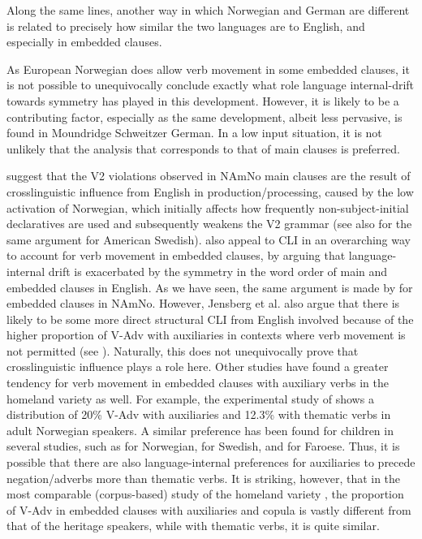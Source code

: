\documentclass[output=paper]{langscibook}
\begin{document}
Along the same lines, another way in which Norwegian and German are different is related to precisely how similar the two languages are to English, and especially in embedded clauses.

As European Norwegian does allow verb movement in some embedded clauses, it is not possible to unequivocally conclude exactly what role language internal-drift towards symmetry has played in this development. However, it is likely to be a contributing factor, especially as the same development, albeit less pervasive, is found in Moundridge Schweitzer German. In a low input situation, it is not unlikely that the analysis that corresponds to that of main clauses is preferred.

\citet{WestergaardEtAl2021} suggest that the V2 violations observed in NAmNo main clauses are the result of crosslinguistic influence from English in production\slash processing, caused by the low activation of Norwegian, which initially affects how frequently non\hyp subject\hyp initial declaratives are used and subsequently weakens the V2 grammar (see also \citealt{LarssonKinn2022} for the same argument for American Swedish). \citet{HoppPutnam2015} also appeal to CLI in an overarching way to account for verb movement in embedded clauses, by arguing that language-internal drift is exacerbated by the symmetry in the word order of main and embedded clauses in English. As we have seen, the same argument is made by \citet{JensbergEtAl2024} for embedded clauses in NAmNo. However, Jensberg et al. also argue that there is likely to be some more direct structural CLI from English involved because of the higher proportion of V-Adv with auxiliaries in contexts where verb movement is not permitted (see ). Naturally, this does not unequivocally prove that crosslinguistic influence plays a role here. Other studies have found a greater tendency for verb movement in embedded clauses with auxiliary verbs in the homeland variety as well. For example, the experimental study of \citet{RingstadKush2021} shows a distribution of 20\% V-Adv with auxiliaries and 12.3\% with thematic verbs in adult Norwegian 
 speakers. A similar preference has been found for children in several studies, such as \citet{RingstadKush2021} for Norwegian, \citet{Håkansson1994} for Swedish, and \citet{HeycockEtAl2013} for Faroese. Thus, it is possible that there are also language-internal preferences for auxiliaries to precede negation/adverbs more than thematic verbs. It is striking, however, that in the most comparable (corpus-based) study of the homeland variety \citep{Ringstad2019}, the proportion of V-Adv in embedded clauses with auxiliaries and copula is vastly different from that of the heritage speakers, while with thematic verbs, it is quite similar.
\end{document}
